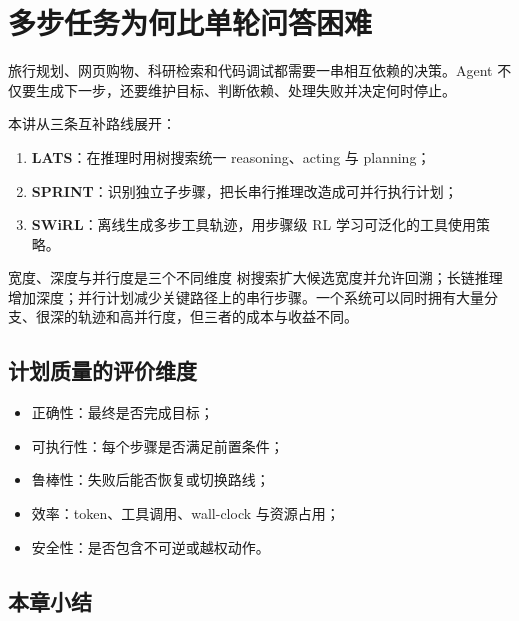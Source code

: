 \documentclass[a4paper]{article}
\begin{document}
\makelecturetitle

\section{多步任务为何比单轮问答困难}

旅行规划、网页购物、科研检索和代码调试都需要一串相互依赖的决策。Agent 不仅要生成下一步，还要维护目标、判断依赖、处理失败并决定何时停止。


本讲从三条互补路线展开：

\begin{enumerate}
    \item \textbf{LATS}：在推理时用树搜索统一 reasoning、acting 与 planning；
    \item \textbf{SPRINT}：识别独立子步骤，把长串行推理改造成可并行执行计划；
    \item \textbf{SWiRL}：离线生成多步工具轨迹，用步骤级 RL 学习可泛化的工具使用策略。
\end{enumerate}

\begin{importantbox}{宽度、深度与并行度是三个不同维度}
树搜索扩大候选宽度并允许回溯；长链推理增加深度；并行计划减少关键路径上的串行步骤。一个系统可以同时拥有大量分支、很深的轨迹和高并行度，但三者的成本与收益不同。
\end{importantbox}

\subsection{计划质量的评价维度}

\begin{itemize}
    \item 正确性：最终是否完成目标；
    \item 可执行性：每个步骤是否满足前置条件；
    \item 鲁棒性：失败后能否恢复或切换路线；
    \item 效率：token、工具调用、wall-clock 与资源占用；
    \item 安全性：是否包含不可逆或越权动作。
\end{itemize}

\subsection{本章小结}
\end{document}
